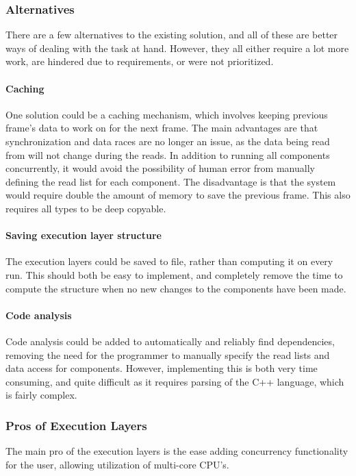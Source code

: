 \subsubsection{Alternatives}
There are a few alternatives to the existing solution, and all of these are better ways of dealing with the task at hand.
However, they all either require a lot more work, are hindered due to requirements, or were not prioritized.

\paragraph{Caching}
One solution could be a caching mechanism, which involves keeping previous frame's data to work on for the next frame\cite[p.930]{game_engine_architecture}.
The main advantages are that synchronization and data races are no longer an issue, as the data being read from will not change during the reads.
In addition to running all components concurrently, it would avoid the possibility of human error from manually defining the read list for each component.
The disadvantage is that the system would require double the amount of memory to save the previous frame.
This also requires all types to be deep copyable.

\paragraph{Saving execution layer structure}
The execution layers could be saved to file, rather than computing it on every run.
This should both be easy to implement, and completely remove the time to compute the structure when no new changes to the components have been made.

\paragraph{Code analysis}
\label{par:detailed_execution_layers_code_analysis}
Code analysis could be added to automatically and reliably find dependencies, removing the need for the programmer to manually specify the read lists and data access for components.
However, implementing this is both very time consuming, and quite difficult as it requires parsing of the C++ language, which is fairly complex.

\subsubsection{Pros of Execution Layers}
The main pro of the execution layers is the ease adding concurrency functionality for the user,
allowing utilization of multi-core CPU's.

